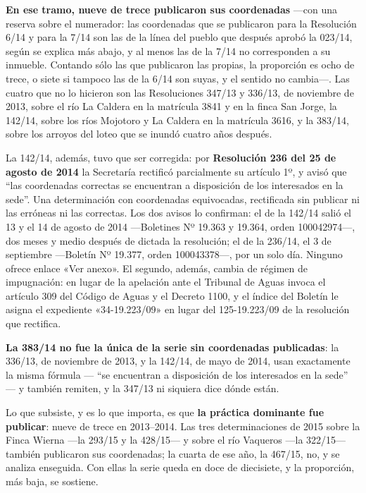 \begin{cautela}
\textbf{En ese tramo, nueve de trece publicaron sus coordenadas} ---con una reserva sobre el numerador: las coordenadas que se publicaron para la Resolución 6/14 y para la 7/14 son las de la línea del pueblo que después aprobó la 023/14, según se explica más abajo, y al menos las de la 7/14 no corresponden a su inmueble. Contando sólo las que publicaron las propias, la proporción es ocho de trece, o siete si tampoco las de la 6/14 son suyas, y el sentido no cambia---. Las cuatro que no lo hicieron son las Resoluciones 347/13 y 336/13, de noviembre de 2013, sobre el río La Caldera en la matrícula 3841 y en la finca San Jorge, la 142/14, sobre los ríos Mojotoro y La Caldera en la matrícula 3616, y la 383/14, sobre los arroyos del loteo que se inundó cuatro años después.

La 142/14, además, tuvo que ser corregida: por \textbf{Resolución 236 del 25 de agosto de 2014} la Secretaría rectificó parcialmente su artículo 1º, y avisó que ``las coordenadas correctas se encuentran a disposición de los interesados en la sede''. Una determinación con coordenadas equivocadas, rectificada sin publicar ni las erróneas ni las correctas. Los dos avisos lo confirman: el de la 142/14 salió el 13 y el 14 de agosto de 2014 ---Boletines Nº 19.363 y 19.364, orden 100042974---, dos meses y medio después de dictada la resolución; el de la 236/14, el 3 de septiembre ---Boletín Nº 19.377, orden 100043378---, por un solo día. Ninguno ofrece enlace «Ver anexo». El segundo, además, cambia de régimen de impugnación: en lugar de la apelación ante el Tribunal de Aguas invoca el artículo 309 del Código de Aguas y el Decreto 1100, y el índice del Boletín le asigna el expediente «34-19.223/09» en lugar del 125-19.223/09 de la resolución que rectifica.

\textbf{La 383/14 no fue la única de la serie sin coordenadas publicadas}: la 336/13, de noviembre de 2013, y la 142/14, de mayo de 2014, usan exactamente la misma fórmula --- ``se encuentran a disposición de los interesados en la sede'' --- y también remiten, y la 347/13 ni siquiera dice dónde están.

Lo que subsiste, y es lo que importa, es que \textbf{la práctica dominante fue publicar}: nueve de trece en 2013--2014. Las tres determinaciones de 2015 sobre la Finca Wierna ---la 293/15 y la 428/15--- y sobre el río Vaqueros ---la 322/15--- también publicaron sus coordenadas; la cuarta de ese año, la 467/15, no, y se analiza enseguida. Con ellas la serie queda en doce de diecisiete, y la proporción, más baja, se sostiene.
\end{cautela}

